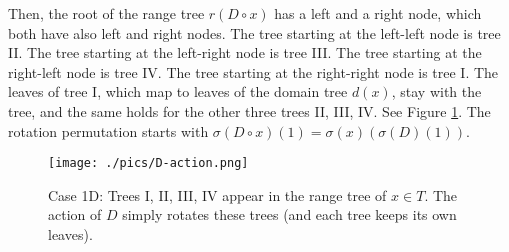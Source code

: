 \documentclass{amsart}
\theoremstyle{definition}
\begin{document}
Then, the root of the range tree $r(D\circ x)$ has a left and a right node, which both have also left and right nodes.
The tree starting at the left-left node is tree II. The tree starting at the left-right node is tree III.
The tree starting at the right-left node is tree IV. The tree starting at the right-right node is tree I.
The leaves of tree I, which map to leaves of the domain tree $d(x)$, stay with the tree, and the same holds for the other three trees II, III, IV. See Figure \ref{f:case1D}.
The rotation permutation starts with $\sigma(D\circ x)(1)=\sigma(x)(\sigma(D)(1))$.
\begin{figure}
\texttt{[image: ./pics/D-action.png]}\\
  \caption{Case 1D: Trees I, II, III, IV appear in the range tree of $x\in T$.
  The action of $D$ simply rotates these trees (and each tree keeps its own leaves). 
  }\label{f:case1D}
\end{figure}
\end{document}
